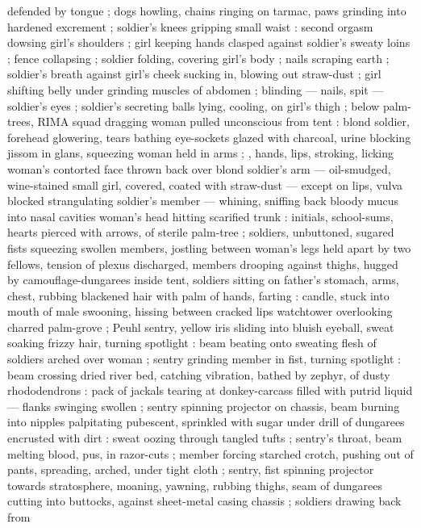 defended by tongue ; dogs howling, chains ringing on tarmac, paws grinding into hardened excrement ;
soldier's knees gripping small waist : second orgasm dowsing girl's shoulders ; girl keeping hands
clasped against soldier's sweaty loins ; fence collapsing ; soldier folding, covering girl's body ;
nails scraping earth ; soldier's breath against girl's cheek sucking in, blowing out straw-dust ;
girl shifting belly under grinding muscles of abdomen ; blinding --- nails, spit --- soldier's eyes
; soldier's secreting balls lying, cooling, on girl's thigh ; below palm-trees, RIMA squad dragging
woman pulled unconscious from tent : blond soldier, forehead glowering, tears bathing eye-sockets
glazed with charcoal, urine blocking jissom in glans, squeezing woman held in arms ; , %
hands, lips, stroking, licking woman's contorted face thrown back over blond soldier's arm ---
oil-smudged, wine-stained {\semislash} small girl, covered, coated with straw-dust --- except on
lips, vulva blocked strangulating soldier's member --- whining, sniffing back bloody mucus into
nasal cavities {\semitwoslash} woman's head hitting scarified trunk : initials, school-sums, hearts
pierced with arrows, of sterile palm-tree ; soldiers, unbuttoned, sugared fists squeezing swollen
members, jostling between woman's legs held apart by two fellows, tension of plexus discharged,
members drooping against thighs, hugged by camouflage-dungarees {\semislash} inside tent, soldiers
sitting on father's stomach, arms, chest, rubbing blackened hair with palm of hands, farting :
candle, stuck into mouth of male swooning, hissing between cracked lips {\semislash} watchtower
overlooking charred palm-grove ; Peuhl sentry, yellow iris sliding into bluish eyeball, sweat
soaking frizzy hair, turning spotlight : beam beating onto sweating flesh of soldiers arched over
woman ; sentry grinding member in fist, turning spotlight : beam crossing dried river bed, catching
vibration, bathed by zephyr, of dusty rhododendrons : pack of jackals tearing at donkey-carcass
filled with putrid liquid --- flanks swinging swollen ; sentry spinning projector on chassis, beam
burning into nipples palpitating pubescent, sprinkled with sugar under drill of dungarees encrusted
with dirt : sweat oozing through tangled tufts ; sentry's throat, beam melting blood, pus, in
razor-cuts ; member forcing starched crotch, pushing out of pants, spreading, arched, under tight
cloth ; sentry, fist spinning projector towards stratosphere, moaning, yawning, rubbing thighs, seam
of dungarees cutting into buttocks, against sheet-metal casing chassis ; soldiers drawing back from
